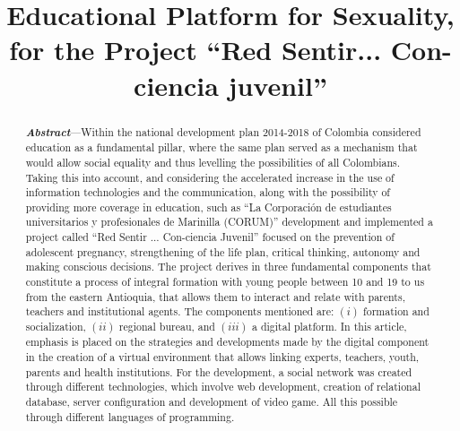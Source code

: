 \documentclass[journal,transmag]{IEEEtran}
\begin{document}
\title{Educational Platform for Sexuality, for the Project ``Red Sentir... Con-ciencia juvenil''}

\author{
}

\maketitle

\begin{abstract}
\textbf{\textit{Abstract}}---Within the national development plan 2014-2018 of Colombia considered education as a fundamental pillar, where the same plan served as a mechanism that would allow social equality and thus levelling the possibilities of all Colombians. Taking this into account, and considering the accelerated increase in the use of information technologies and the communication, along with the possibility of providing more coverage in education, such as ``La Corporación de estudiantes universitarios y profesionales de Marinilla (CORUM)'' development and implemented a project called ``Red Sentir ... Con-ciencia Juvenil'' focused on the prevention of adolescent pregnancy, strengthening of the life plan, critical thinking, autonomy and making conscious decisions. The project derives in three fundamental components that constitute a process of integral formation with young people between 10 and 19 to us from the eastern Antioquia, that allows them to interact and relate with parents, teachers and institutional agents. The components mentioned are: $(i)$ formation and socialization, $(ii)$ regional bureau, and $(iii)$ a digital platform. In this article, emphasis is placed on the strategies and developments made by the digital component in the creation of a virtual environment that allows linking experts, teachers, youth, parents and health institutions. For the development, a social network was created through different technologies, which involve web development, creation of relational database, server configuration and development of video game. All this possible through different languages of programming.
\end{abstract}
\end{document}
